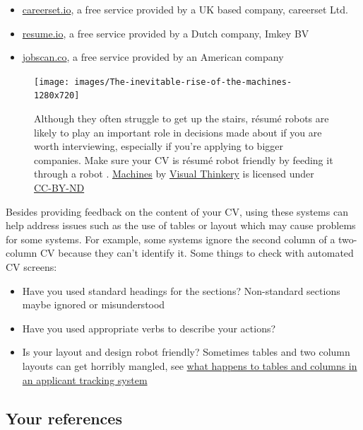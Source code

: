 \documentclass[
]{book}
\providecommand{\tightlist}{%
  \setlength{\itemsep}{0pt}\setlength{\parskip}{0pt}}
\begin{document}
\begin{itemize}
\tightlist
\item
  \href{https://careerset.io}{careerset.io}, a free service provided by a UK based company, careerset Ltd.
\item
  \href{https://resume.io}{resume.io}, a free service provided by a Dutch company, Imkey BV
\item
  \href{https://www.jobscan.co}{jobscan.co}, a free service provided by an American company
\end{itemize}

\begin{figure}

{\centering \texttt{[image: images/The-inevitable-rise-of-the-machines-1280x720]} 

}

\caption{Although they often struggle to get up the stairs, résumé robots are likely to play an important role in decisions made about if you are worth interviewing, especially if you're applying to bigger companies. Make sure your CV is résumé robot friendly by feeding it through a robot . \href{https://bryanmmathers.com/machines/}{Machines} by \href{https://visualthinkery.com/}{Visual Thinkery} is licensed under \href{https://creativecommons.org/licenses/by-nd/4.0/}{CC-BY-ND}}\label{fig:machines-fig}
\end{figure}



Besides providing feedback on the content of your CV, using these systems can help address issues such as the use of tables or layout which may cause problems for some systems. For example, some systems ignore the second column of a two-column CV because they can't identify it. Some things to check with automated CV screens:

\begin{itemize}
\tightlist
\item
  Have you used standard headings for the sections? Non-standard sections maybe ignored or misunderstood
\item
  Have you used appropriate verbs to describe your actions?
\item
  Is your layout and design robot friendly? Sometimes tables and two column layouts can get horribly mangled, see \href{https://www.jobscan.co/blog/resume-tables-columns-ats/}{what happens to tables and columns in an applicant tracking system} \citep{jobscan}
\end{itemize}

\hypertarget{referees}{%
\subsection{Your references}\label{referees}}
\end{document}
